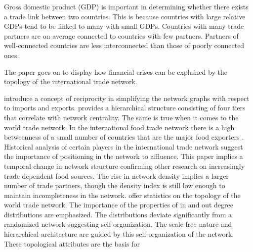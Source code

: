 Gross domestic product (GDP) is important in determining whether there exists a trade link between two countries. This is because countries with large relative GDPs tend to be linked to many with small GDPs. Countries with many trade partners are on average connected to countries with few partners. Partners of well-connected countries are less interconnected than those of poorly connected ones.





The paper goes on to display how financial crises can be explained by the topology of the international trade network. 
















introduce a concept of reciprocity in simplifying the network graphs with respect to imports and exports.  \citep{zhou2016structure} provides a hierarchical structure consisting of four tiers that correlate with network centrality.  The same is true when it comes to the world trade network.  In the international food trade network there is a high betweenness of a small number of countries that are the major food exporters \citep{garlaschelli2005structure}.   Historical analysis of certain players in the international trade network suggest the importance of positioning in the network to affluence. This paper implies a temporal change in network structure confirming other research on increasingly trade dependent food sources. The rise in network density implies a larger number of trade partners, though the density index is still low enough to maintain incompleteness in the network. \cite{serrano2003topology} offer statistics on the topology of the world trade network. The importance of the properties of in and out degree distributions are emphasized. The distributions deviate significantly from a randomized network suggesting self-organization. The scale-free nature and hierarchical architecture are guided by this self-organization of the network.  These topological attributes are the basis for \par






